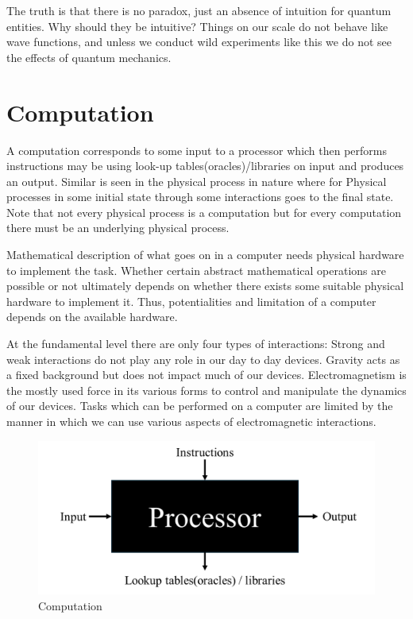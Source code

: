 \documentclass[12pt, oneside]{book}
\theoremstyle{definition}
\theoremstyle{definition}
\theoremstyle{remark}
\begin{document}
The truth is that there is no paradox, just an absence of intuition for quantum entities. Why should they be intuitive? Things on our scale do not behave like wave functions, and unless we conduct wild experiments like this we do not see the effects of quantum mechanics.

\section{Computation}
A computation corresponds to some input to a processor which then performs instructions may be using look-up tables(oracles)/libraries on input and produces an output. Similar is seen in the physical process in nature where for Physical processes in some initial state through some interactions goes to the final state. Note that not every physical process is a computation but for every computation there must be an underlying physical process. 


Mathematical description of what goes on in a computer needs physical hardware to implement the task. Whether certain abstract mathematical operations are possible or not ultimately depends on whether there exists some suitable physical hardware to implement it. Thus, potentialities and limitation of a computer depends on the available hardware.

At the fundamental level there are only four types of interactions: Strong and weak interactions do not play any role in our day to day devices. Gravity acts as a fixed background but does not impact much of our devices. Electromagnetism is the mostly used force in its various forms to control and manipulate the dynamics of our devices.
Tasks which can be performed on a computer are limited by the manner in which we can use various aspects of electromagnetic interactions.

\begin{figure}
    \centering
    \includegraphics[width=0.75\linewidth]{../images/computation.png}
    \caption{Computation}
    \label{fig:computation}
\end{figure}
\end{document}
